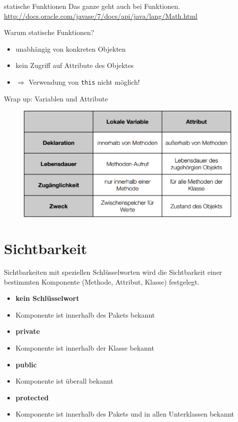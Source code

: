\documentclass[18pt]{beamer}
\begin{document}
\begin{frame}[fragile]{statische Funktionen}
  Das ganze geht auch bei Funktionen.\\
  \url{http://docs.oracle.com/javase/7/docs/api/java/lang/Math.html}
  \pause
  \begin{block}{Warum statische Funktionen?}
    \begin{itemize}
      \item unabhängig von konkreten Objekten
      \item kein Zugriff auf Attribute des Objektes
      \item $\Rightarrow$ Verwendung von \lstinline$this$ nicht möglich!
    \end{itemize}
  \end{block}
\end{frame}

\begin{frame}{Wrap up: Variablen und Attribute}
	\begin{figure}
	\centering
  \includegraphics[width=\textwidth]{tabelle.png}
  \end{figure}
\end{frame}

\section{Sichtbarkeit}
\begin{frame}{Sichtbarkeiten}
	mit speziellen Schlüsselworten wird die Sichtbarkeit einer bestimmten Komponente (Methode, Attribut, Klasse) festgelegt.
  \begin{itemize}
    \item \textbf{kein Schlüsselwort}
    \item[] Komponente ist innerhalb des Pakets bekannt
    \pause
    \item \textbf{private}
    \item[] Komponente ist innerhalb der Klasse bekannt
    \pause
    \item \textbf{public}
    \item[] Komponente ist überall bekannt
    \pause
    \item \textbf{protected}
    \item[] Komponente ist innerhalb des Pakets und in allen Unterklassen bekannt
  \end{itemize}
\end{frame}
\end{document}
